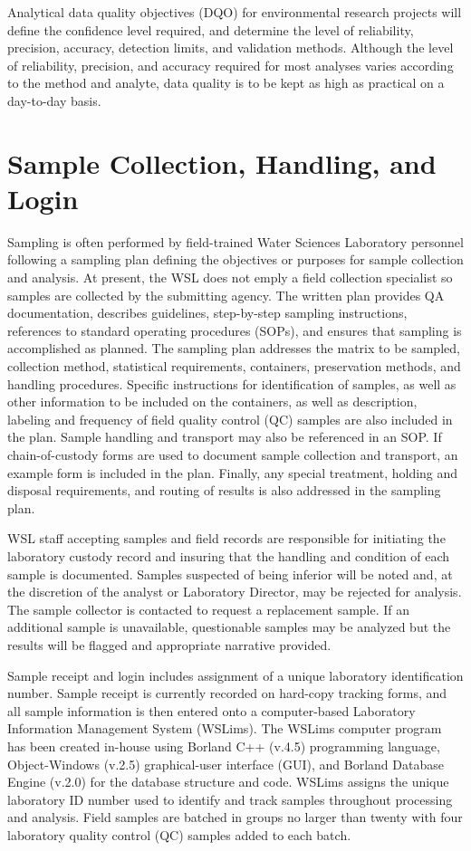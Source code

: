 Analytical data quality objectives (DQO) for environmental research 
projects will define the confidence level required, and determine the 
level of reliability, precision, accuracy, detection limits, and 
validation methods. Although the level of reliability, precision, and 
accuracy required for most analyses varies according to the method and 
analyte, data quality is to be kept as high as practical on a day-to-day 
basis. 



\section{Sample Collection, Handling, and Login}
Sampling is often performed by field-trained Water Sciences 
Laboratory personnel following a sampling plan defining the objectives 
or purposes for sample collection and analysis. At present, the WSL does not emply a field collection specialist so samples are collected by the submitting agency. The written plan 
provides QA documentation, describes guidelines, step-by-step sampling 
instructions, references to standard operating procedures (SOPs), and 
ensures that sampling is accomplished as planned. The sampling plan 
addresses the matrix to be sampled, collection method, statistical 
requirements, containers, preservation methods, and handling procedures. 
Specific instructions for identification of samples, as well as other 
information to be included on the containers, as well as description, 
labeling and frequency of field quality control (QC) samples are also 
included in the plan. Sample handling and transport may also be 
referenced in an SOP. If chain-of-custody forms are used to document 
sample collection and transport, an example form is included in the 
plan. Finally, any special treatment, holding and disposal requirements, 
and routing of results is also addressed in the sampling plan.

WSL staff accepting samples and field records are responsible for 
initiating the laboratory custody record and insuring that the handling 
and condition of each sample is documented. Samples suspected of being 
inferior will be noted and, at the discretion of the analyst or 
Laboratory Director, may be rejected for analysis. The sample collector 
is contacted to request a replacement sample. If an additional sample is 
unavailable, questionable samples may be analyzed but the results will 
be flagged and appropriate narrative provided.

Sample receipt and login includes assignment of a unique laboratory 
identification number. Sample receipt is currently recorded on hard-copy 
tracking forms, and all sample information is then entered onto a 
computer-based Laboratory Information Management System (WSLims). The 
WSLims computer program has been created in-house using Borland C++ 
(v.4.5) programming language, Object-Windows (v.2.5) graphical-user 
interface (GUI), and Borland Database Engine (v.2.0) for the database 
structure and code. WSLims assigns the unique laboratory ID number used 
to identify and track samples throughout processing and analysis. Field 
samples are batched in groups no larger than twenty with four laboratory 
quality control (QC) samples added to each batch.


